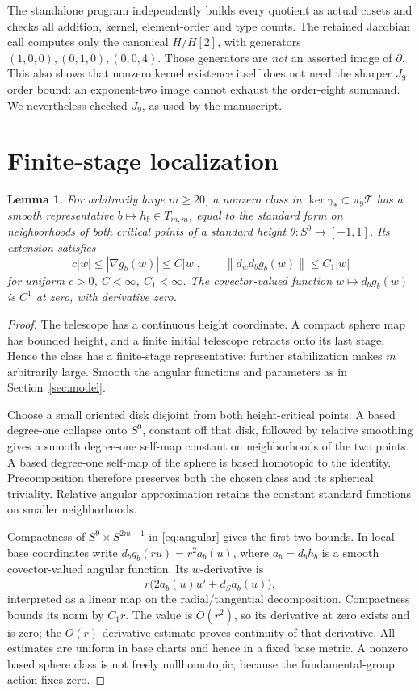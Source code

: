 \documentclass[11pt]{article}
\newtheorem{lemma}[theorem]{Lemma}
\theoremstyle{remark}
\newcommand{\T}{\mathcal T}
\newcommand{\norm}[1]{\left\lVert #1\right\rVert}
\begin{document}
The standalone program independently builds every quotient as actual
cosets and checks all addition, kernel, element-order and type counts.
The retained Jacobian call computes only the canonical
\(H/H[2]\), with generators \((1,0,0),(0,1,0),(0,0,4)\).
Those generators are \emph{not} an asserted image of \(\partial\).
This also shows that nonzero kernel existence itself does not need
the sharper \(J_9\) order bound: an exponent-two image cannot exhaust
the order-eight summand. We nevertheless checked \(J_9\), as used
by the manuscript.

\section{Finite-stage localization}
\begin{lemma}\label{lem:localized}
For arbitrarily large \(m\geq20\), a nonzero class in
\(\ker\gamma_*\subset\pi_9\T\) has a smooth representative
\(b\mapsto h_b\in T_{m,m}\), equal to the standard form on
neighborhoods of both critical points of a standard height
\(\theta:S^9\to[-1,1]\). Its extension satisfies
\begin{equation}\label{eq:bounds}
 c|w|\leq|\nabla g_b(w)|\leq C|w|,\qquad
 \norm{d_wd_bg_b(w)}\leq C_1|w|
\end{equation}
for uniform \(c>0\), \(C<\infty\), \(C_1<\infty\).
The covector-valued function \(w\mapsto d_bg_b(w)\) is \(C^1\)
at zero, with derivative zero.
\end{lemma}
\begin{proof}
The telescope has a continuous height coordinate. A compact sphere
map has bounded height, and a finite initial telescope retracts onto
its last stage. Hence the class has a finite-stage representative;
further stabilization makes \(m\) arbitrarily large. Smooth the
angular functions and parameters as in Section~\ref{sec:model}.

Choose a small oriented disk disjoint from both height-critical
points. A based degree-one collapse onto \(S^9\), constant off that
disk, followed by relative smoothing gives a smooth degree-one
self-map constant on neighborhoods of the two points. A based
degree-one self-map of the sphere is based homotopic to the identity.
Precomposition therefore preserves both the chosen class and its
spherical triviality. Relative angular approximation retains the
constant standard functions on smaller neighborhoods.

Compactness of \(S^9\times S^{2m-1}\) in \eqref{eq:angular} gives
the first two bounds. In local base coordinates write
\(d_bg_b(ru)=r^2a_b(u)\), where \(a_b=d_bh_b\) is a smooth
covector-valued angular function. Its \(w\)-derivative is
\[
 r\bigl(2a_b(u)u^\flat+d_Sa_b(u)\bigr),
\]
interpreted as a linear map on the radial/tangential decomposition.
Compactness bounds its norm by \(C_1r\).
The value is \(O(r^2)\), so its derivative at zero exists and is zero;
the \(O(r)\) derivative estimate proves continuity of that derivative.
All estimates are uniform in base charts and hence in a fixed base
metric. A nonzero based sphere class is not freely nullhomotopic,
because the fundamental-group action fixes zero.
\end{proof}
\end{document}
